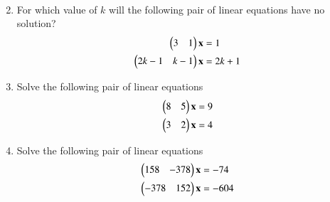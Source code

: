 \begin{enumerate}[label=\arabic*.,ref=\thesubsection.\theenumi]
\begin{align}
\end{align}
\item For which value of $k$ will the following pair of linear equations have no solution?
\begin{align}
\begin{split}
\begin{pmatrix}3 & 1 \end{pmatrix}\mathbf{x}&=1
\\
\begin{pmatrix}2k-1 & k-1 \end{pmatrix}\mathbf{x}&=2k+1
\end{split}
\end{align}
\item Solve the following pair of linear equations
\begin{align}
\begin{split}
\begin{pmatrix}8 & 5 \end{pmatrix}\mathbf{x}&=9
\\
\begin{pmatrix}3 & 2 \end{pmatrix}\mathbf{x}&=4
\end{split}
\end{align}
%
\item Solve the following pair of linear equations
\begin{align}
\begin{split}
\begin{pmatrix}158 & -378 \end{pmatrix}\mathbf{x}&=-74
\\
\begin{pmatrix}-378 & 152 \end{pmatrix}\mathbf{x}&=-604
\end{split}
\end{align}


\end{enumerate}
